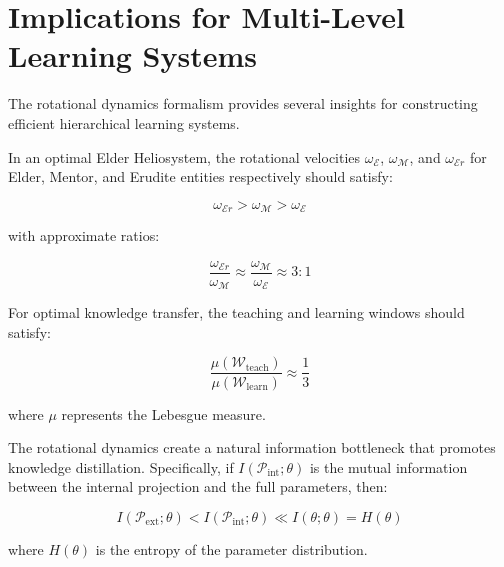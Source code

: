 \section{Implications for Multi-Level Learning Systems}

The rotational dynamics formalism provides several insights for constructing efficient hierarchical learning systems.

\begin{corollary}
In an optimal Elder Heliosystem, the rotational velocities $\omega_{\mathcal{E}}$, $\omega_{\mathcal{M}}$, and $\omega_{\mathcal{E}r}$ for Elder, Mentor, and Erudite entities respectively should satisfy:

\begin{equation}
\omega_{\mathcal{E}r} > \omega_{\mathcal{M}} > \omega_{\mathcal{E}}
\end{equation}

with approximate ratios:

\begin{equation}
\frac{\omega_{\mathcal{E}r}}{\omega_{\mathcal{M}}} \approx \frac{\omega_{\mathcal{M}}}{\omega_{\mathcal{E}}} \approx 3:1
\end{equation}
\end{corollary}

\begin{corollary}
For optimal knowledge transfer, the teaching and learning windows should satisfy:

\begin{equation}
\frac{\mu(\mathcal{W}_{\text{teach}})}{\mu(\mathcal{W}_{\text{learn}})} \approx \frac{1}{3}
\end{equation}

where $\mu$ represents the Lebesgue measure.
\end{corollary}

\begin{theorem}
The rotational dynamics create a natural information bottleneck that promotes knowledge distillation. Specifically, if $I(\mathcal{P}_{\text{int}}; \theta)$ is the mutual information between the internal projection and the full parameters, then:

\begin{equation}
I(\mathcal{P}_{\text{ext}}; \theta) < I(\mathcal{P}_{\text{int}}; \theta) \ll I(\theta; \theta) = H(\theta)
\end{equation}

where $H(\theta)$ is the entropy of the parameter distribution.
\end{theorem}

